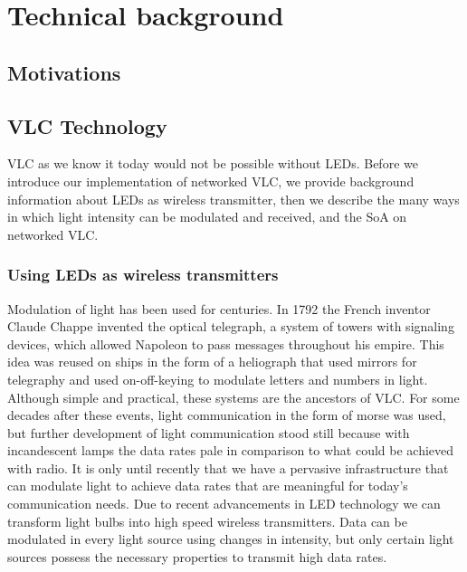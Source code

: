 \chapter{Technical background}
\label{Technical}



\section{Motivations}



\section{VLC Technology}
VLC as we know it today would not be possible without LEDs. Before we introduce
our implementation of networked VLC, we provide background information
about LEDs as wireless transmitter, then we describe the many ways in which
light intensity can be modulated and received, and the SoA on networked VLC.

\subsection{Using LEDs as wireless transmitters}

Modulation of light has been used for centuries. In 1792 the French inventor
Claude Chappe invented the optical telegraph, a system of towers with signaling
devices, which allowed Napoleon to pass messages throughout his empire. This
idea was reused on ships in the form of a heliograph that used mirrors for telegraphy
and used on-off-keying to modulate letters and numbers in light. Although
simple and practical, these systems are the ancestors of VLC. For some decades
after these events, light communication in the form of morse was used, but further
development of light communication stood still because with incandescent lamps
the data rates pale in comparison to what could be achieved with radio.
It is only until recently that we have a pervasive infrastructure that can modulate
light to achieve data rates that are meaningful for today’s communication needs.
Due to recent advancements in LED technology we can transform light bulbs into
high speed wireless transmitters. Data can be modulated in every light source
using changes in intensity, but only certain light sources possess the necessary
properties to transmit high data rates.

